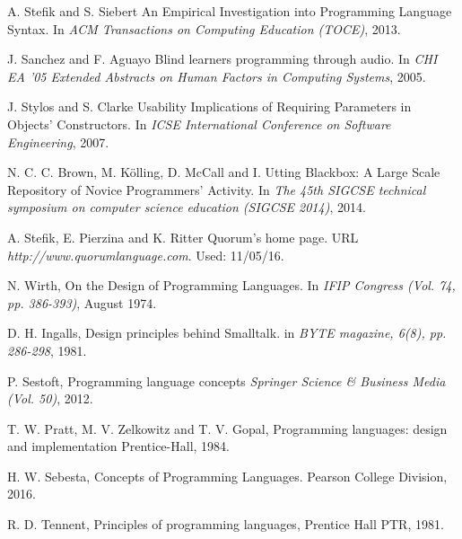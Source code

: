 \documentclass[preprint,10pt]{sigplanconf}
\begin{document}
\begin{thebibliography}{}
A. Stefik and S. Siebert \newblock An Empirical Investigation into Programming Language Syntax. \newblock In \emph{ACM Transactions on Computing Education (TOCE)}, 2013.

J. Sanchez and F. Aguayo \newblock Blind learners programming through audio. \newblock In \emph{CHI EA '05 Extended Abstracts on Human Factors in Computing Systems}, 2005.

J. Stylos and S. Clarke \newblock Usability Implications of Requiring Parameters in Objects' Constructors. \newblock In \emph{ICSE International Conference on Software Engineering}, 2007.

N. C. C. Brown, M. Kölling, D. McCall and I. Utting \newblock Blackbox: A Large Scale Repository of Novice Programmers’ Activity. \newblock In \emph{The 45th SIGCSE technical symposium on computer science education (SIGCSE 2014)}, 2014.

A. Stefik, E. Pierzina and K. Ritter \newblock Quorum's home page. \newblock URL \emph{http://www.quorumlanguage.com}. \newblock Used: 11/05/16.

N. Wirth, \newblock On the Design of Programming Languages. \newblock In \emph{IFIP Congress (Vol. 74, pp. 386-393)}, August 1974.

D. H. Ingalls,  \newblock Design principles behind Smalltalk. \newblock in \emph{BYTE magazine, 6(8), pp. 286-298}, 1981. 

P. Sestoft, \newblock Programming language concepts  \newblock \emph{Springer Science \& Business Media (Vol. 50)}, 2012.

T. W. Pratt, M. V. Zelkowitz and T. V.  Gopal, \newblock Programming languages: design and implementation \newblock Prentice-Hall, 1984.

H. W. Sebesta, \newblock Concepts of Programming Languages. \newblock Pearson College Division, 2016.

R. D. Tennent, \newblock Principles of programming languages, \newblock Prentice Hall PTR, 1981.


\end{thebibliography}
\end{document}
